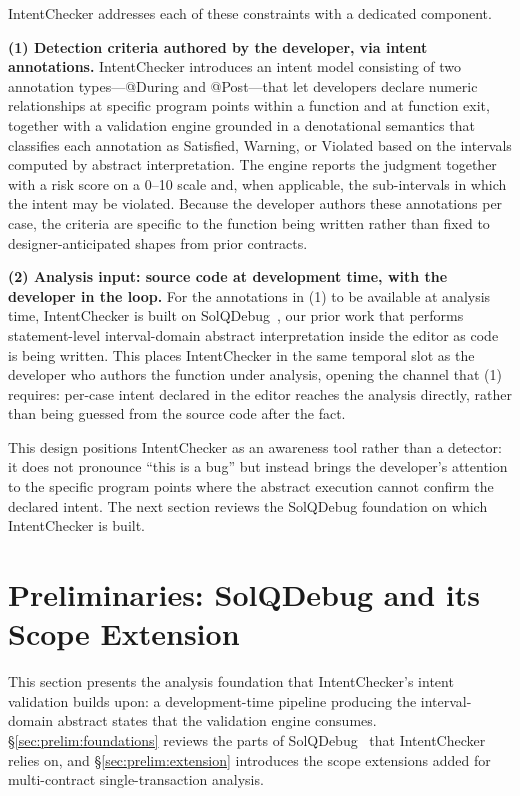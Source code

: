 \documentclass[pdflatex,sn-basic]{sn-jnl}%
\theoremstyle{thmstyleone}%
\theoremstyle{thmstyletwo}%
\theoremstyle{thmstylethree}%
\begin{document}
IntentChecker addresses each of these constraints with a dedicated component.

\smallskip
\noindent\textbf{(1) Detection criteria authored by the developer, via intent annotations.}
IntentChecker introduces an intent model consisting of two annotation types---@During and @Post---that let developers declare numeric relationships at specific program points within a function and at function exit, together with a validation engine grounded in a denotational semantics that classifies each annotation as Satisfied, Warning, or Violated based on the intervals computed by abstract interpretation.
The engine reports the judgment together with a risk score on a 0--10 scale and, when applicable, the sub-intervals in which the intent may be violated.
Because the developer authors these annotations per case, the criteria are specific to the function being written rather than fixed to designer-anticipated shapes from prior contracts.

\smallskip
\noindent\textbf{(2) Analysis input: source code at development time, with the developer in the loop.}
For the annotations in (1) to be available at analysis time, IntentChecker is built on SolQDebug~\citep{solqdebug}, our prior work that performs statement-level interval-domain abstract interpretation inside the editor as code is being written.
This places IntentChecker in the same temporal slot as the developer who authors the function under analysis, opening the channel that (1) requires: per-case intent declared in the editor reaches the analysis directly, rather than being guessed from the source code after the fact.

\smallskip
This design positions IntentChecker as an awareness tool rather than a detector: it does not pronounce ``this is a bug'' but instead brings the developer's attention to the specific program points where the abstract execution cannot confirm the declared intent.
The next section reviews the SolQDebug foundation on which IntentChecker is built.

\section{Preliminaries: SolQDebug and its Scope Extension}\label{sec:prelim}

This section presents the analysis foundation that IntentChecker's intent validation builds upon: a development-time pipeline producing the interval-domain abstract states that the validation engine consumes.
§\ref{sec:prelim:foundations} reviews the parts of SolQDebug~\citep{solqdebug} that IntentChecker relies on, and §\ref{sec:prelim:extension} introduces the scope extensions added for multi-contract single-transaction analysis.
\end{document}
